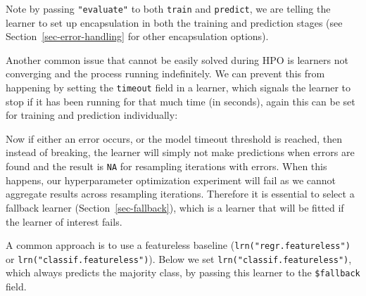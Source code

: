 \begin{Shaded}
\begin{Highlighting}[]
\SpecialCharTok{$}\OtherTok{=} \NormalTok{(} \NormalTok{, } \NormalTok{)}
\end{Highlighting}
\end{Shaded}

Note by passing \texttt{"evaluate"} to both \texttt{train} and
\texttt{predict}, we are telling the learner to set up encapsulation in
both the training and prediction stages (see
Section~\ref{sec-error-handling} for other encapsulation options).

Another common issue that cannot be easily solved during HPO is learners
not converging and the process running indefinitely. We can prevent this
from happening by setting the \texttt{timeout} field in a learner, which
signals the learner to stop if it has been running for that much time
(in seconds), again this can be set for training and prediction
individually:

\begin{Shaded}
\begin{Highlighting}[]
\SpecialCharTok{$}\OtherTok{=} \NormalTok{(} \NormalTok{, } \NormalTok{)}
\end{Highlighting}
\end{Shaded}

Now if either an error occurs, or the model timeout threshold is
reached, then instead of breaking, the learner will simply not make
predictions when errors are found and the result is \texttt{NA} for
resampling iterations with errors. When this happens, our hyperparameter
optimization experiment will fail as we cannot aggregate results across
resampling iterations. Therefore it is essential to select a fallback
learner (Section~\ref{sec-fallback}), which is a
learner that will be fitted if the learner of interest fails.

A common approach is to use a featureless baseline
(\texttt{lrn("regr.featureless")} or
\texttt{lrn("classif.featureless")}). Below we set
\texttt{lrn("classif.featureless")}, which always predicts the majority
class, by passing this learner to the \texttt{\$fallback} field.

\begin{Shaded}
\begin{Highlighting}[]
\SpecialCharTok{$}\OtherTok{=} \NormalTok{(}\NormalTok{)}
\end{Highlighting}
\end{Shaded}

